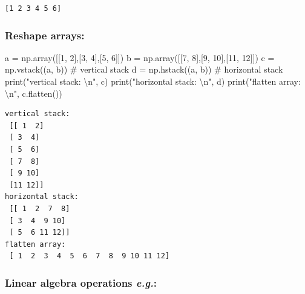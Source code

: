 \documentclass[
  letterpaper,
  DIV=11,
  numbers=noendperiod]{scrreprt}
\newenvironment{Shaded}{\begin{snugshade}}{\end{snugshade}}
\newcommand{\BuiltInTok}[1]{\textcolor[rgb]{0.00,0.23,0.31}{#1}}
\newcommand{\CharTok}[1]{\textcolor[rgb]{0.13,0.47,0.30}{#1}}
\newcommand{\CommentTok}[1]{\textcolor[rgb]{0.37,0.37,0.37}{#1}}
\newcommand{\DecValTok}[1]{\textcolor[rgb]{0.68,0.00,0.00}{#1}}
\newcommand{\NormalTok}[1]{\textcolor[rgb]{0.00,0.23,0.31}{#1}}
\newcommand{\OperatorTok}[1]{\textcolor[rgb]{0.37,0.37,0.37}{#1}}
\newcommand{\StringTok}[1]{\textcolor[rgb]{0.13,0.47,0.30}{#1}}
\begin{document}
\begin{verbatim}
[1 2 3 4 5 6]
\end{verbatim}

\subsubsection*{Reshape arrays:}\label{reshape-arrays}

\begin{Shaded}
\begin{Highlighting}[]
\NormalTok{a }\OperatorTok{=}\NormalTok{ np.array([[}\DecValTok{1}\NormalTok{, }\DecValTok{2}\NormalTok{],[}\DecValTok{3}\NormalTok{, }\DecValTok{4}\NormalTok{],[}\DecValTok{5}\NormalTok{, }\DecValTok{6}\NormalTok{]])}
\NormalTok{b }\OperatorTok{=}\NormalTok{ np.array([[}\DecValTok{7}\NormalTok{, }\DecValTok{8}\NormalTok{],[}\DecValTok{9}\NormalTok{, }\DecValTok{10}\NormalTok{],[}\DecValTok{11}\NormalTok{, }\DecValTok{12}\NormalTok{]])}
\NormalTok{c }\OperatorTok{=}\NormalTok{ np.vstack((a, b)) }\CommentTok{\# vertical stack}
\NormalTok{d }\OperatorTok{=}\NormalTok{ np.hstack((a, b)) }\CommentTok{\# horizontal stack}
\BuiltInTok{print}\NormalTok{(}\StringTok{"vertical stack: }\CharTok{\textbackslash{}n}\StringTok{"}\NormalTok{, c)}
\BuiltInTok{print}\NormalTok{(}\StringTok{"horizontal stack: }\CharTok{\textbackslash{}n}\StringTok{"}\NormalTok{, d)}
\BuiltInTok{print}\NormalTok{(}\StringTok{"flatten array: }\CharTok{\textbackslash{}n}\StringTok{"}\NormalTok{, c.flatten())}
\end{Highlighting}
\end{Shaded}

\begin{verbatim}
vertical stack: 
 [[ 1  2]
 [ 3  4]
 [ 5  6]
 [ 7  8]
 [ 9 10]
 [11 12]]
horizontal stack: 
 [[ 1  2  7  8]
 [ 3  4  9 10]
 [ 5  6 11 12]]
flatten array: 
 [ 1  2  3  4  5  6  7  8  9 10 11 12]
\end{verbatim}

\subsubsection*{\texorpdfstring{Linear algebra operations
\emph{e.g.}:}{Linear algebra operations e.g.:}}\label{linear-algebra-operations-e.g.}
\end{document}
